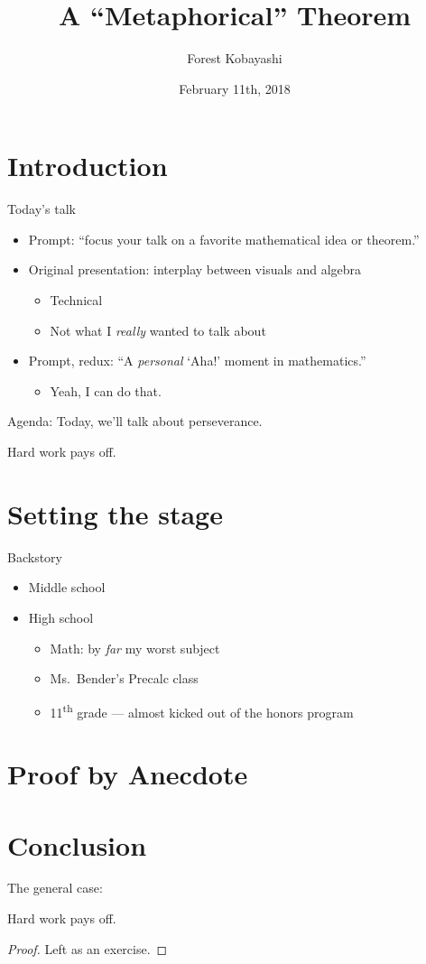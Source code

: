 \documentclass{fkpresentation}
\title{\textmd{A ``Metaphorical'' Theorem}}
\author{Forest Kobayashi}
\institute{Harvey Mudd College}
\date{February 11th, 2018}
\theoremstyle{plain}%
\begin{document}
\frame{\titlepage}
\section{Introduction}
\begin{frame}{Today's talk}
  \begin{itemize}
    \item Prompt: ``focus your talk on a favorite mathematical idea or
      theorem.'' \pause
    \item Original presentation: interplay between visuals and algebra
      \begin{itemize}
        \item Technical
        \item Not what I \emph{really} wanted to talk about\pause
      \end{itemize}
    \item Prompt, redux: ``A \emph{\color{red}personal} `Aha!' moment in
      mathematics.''\pause
      \begin{itemize}
        \item Yeah, I can do that.
      \end{itemize}
  \end{itemize}
\end{frame}
\begin{frame}{Agenda:}
  Today, we'll talk about perseverance. \pause
  \begin{theorem}
    Hard work pays off.
  \end{theorem}
\end{frame}

\section{Setting the stage}
\begin{frame}{Backstory}
  \begin{itemize}
    \item Middle school
    \item High school
      \begin{itemize}
        \item Math: by \emph{far} my worst subject
        \item Ms.\ Bender's Precalc class
        \item 11\textsuperscript{th} grade --- almost kicked out of the honors
          program
      \end{itemize}
  \end{itemize}
\end{frame}

\section{Proof by Anecdote}

\section{Conclusion}
\begin{frame}{The general case:}
  \vfill
  \begin{theorem}
    Hard work pays off.
  \end{theorem}\pause
  \begin{proof}
    Left as an exercise.
  \end{proof}
  \vfill
\end{frame}
\end{document}
